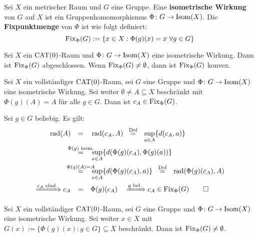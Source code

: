 \begin{definition}
\label{def:1.25}
	Sei $X$ ein metrischer Raum und $G$ eine Gruppe.
	Eine \textbf{isometrische Wirkung} von $G$ auf $X$ ist ein Gruppenhomomorphismus $\Phi \colon G \rightarrow \operatorname{Isom}(X)$. 
	Die \textbf{Fixpunktmenge} von $\Phi$ ist wie folgt definiert: 
	\[
		\operatorname{Fix}_\Phi(G) := \{x \in X : \Phi(g)(x) = x \ \forall g \in G\}
	\]
\end{definition}

\begin{lemma}
\label{lemma:1.26}
	Sei $X$ ein $\operatorname{CAT(0)}$-Raum und $\Phi\colon G \rightarrow \operatorname{Isom}(X)$ eine isometrische Wirkung.
	Dann ist $\operatorname{Fix}_\Phi(G)$ abgeschlossen. 
	Wenn $\operatorname{Fix}_\Phi(G) \neq \emptyset$, dann ist $\operatorname{Fix}_\Phi(G)$ konvex. 
\end{lemma}

\begin{satz}
\label{satz:1.27} \label{BTFT}
	Sei $X$ ein vollständiger $\operatorname{CAT(0)}$-Raum, sei $G$ eine Gruppe und $\Phi\colon G \rightarrow \operatorname{Isom}(X)$ eine isometrische Wirkung.  
	Sei weiter $\emptyset \neq A \subseteq X$ beschränkt mit $\Phi(g)(A) = A$ für alle $g \in G$.
	Dann ist $c_A \in \operatorname{Fix}_\Phi(G)$.
\end{satz}

\begin{beweis}
	Sei $g \in G$ beliebig.
	Es gilt:
	\begin{align*}
		\rad(A) &\stack{}{=} \rad(c_A,A) \stack{\text{Def}}{=} \sup_{a \in A}\{ d(c_A,a)\} \\
		&\stack{\Phi(g) \text{ isom.}}{=} \sup_{a \in A} \{d(\Phi(g)(c_A),\Phi(g)(a))\} \\
		&\stack{\Phi(g)(A)=A}{=} \sup_{a \in A} \{d(\Phi(g)(c_A),a)\} \stack{\text{Def}}{=} \rad(\Phi(g)(c_A),A) \\
		\xRightarrow{c_A \text{ eind.}} c_A &\stack{}{=} \Phi(g)(c_A) \quad \xRightarrow{g \text{ bel.}} c_A \in \Fix_\Phi(G) \qedhere
	\end{align*}
\end{beweis}

\begin{korollar}
\label{kor:1.28}
	Sei $X$ ein vollständiger $\operatorname{CAT(0)}$-Raum, sei $G$ eine Gruppe und $\Phi\colon G \rightarrow \operatorname{Isom}(X)$ eine isometrische Wirkung.
	Sei weiter $x \in X$ mit $G(x) := \{\Phi(g)(x) : g \in G\} \subseteq X$ beschränkt.
	Dann ist $\operatorname{Fix}_\Phi(G) \neq \emptyset$.
\end{korollar}


